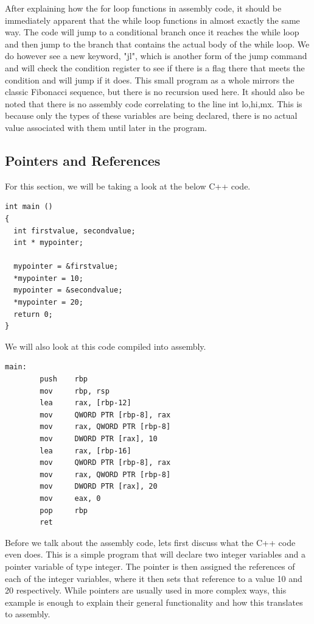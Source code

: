 \documentclass{article}
\theoremstyle{theorem}
\theoremstyle{definition}
\theoremstyle{remark}
\begin{document}
After explaining how the for loop functions in assembly code, it should be immediately apparent that the while loop functions in almost exactly the same way. The code will jump to a conditional branch once it reaches the while loop and then jump to the branch that contains the actual body of the while loop. We do however see a new keyword, "jl", which is another form of the jump command and will check the condition register to see if there is a flag there that meets the condition and will jump if it does. This small program as a whole mirrors the classic Fibonacci sequence, but there is no recursion used here. It should also be noted that there is no assembly code correlating to the line int lo,hi,mx. This is because only the types of these variables are being declared, there is no actual value associated with them until later in the program.

\subsection{Pointers and References}

For this section, we will be taking a look at the below C++ code.

\begin{lstlisting}
int main ()
{
  int firstvalue, secondvalue;
  int * mypointer;

  mypointer = &firstvalue;
  *mypointer = 10;
  mypointer = &secondvalue;
  *mypointer = 20;
  return 0;
}
\end{lstlisting}

We will also look at this code compiled into assembly.

\begin{lstlisting}
main:
        push    rbp
        mov     rbp, rsp
        lea     rax, [rbp-12]
        mov     QWORD PTR [rbp-8], rax
        mov     rax, QWORD PTR [rbp-8]
        mov     DWORD PTR [rax], 10
        lea     rax, [rbp-16]
        mov     QWORD PTR [rbp-8], rax
        mov     rax, QWORD PTR [rbp-8]
        mov     DWORD PTR [rax], 20
        mov     eax, 0
        pop     rbp
        ret
\end{lstlisting}

Before we talk about the assembly code, lets first discuss what the C++ code even does. This is a simple program that will declare two integer variables and a pointer variable of type integer. The pointer is then assigned the references of each of the integer variables, where it then sets that reference to a value 10 and 20 respectively. While pointers are usually used in more complex ways, this example is enough to explain their general functionality and how this translates to assembly.
\end{document}
